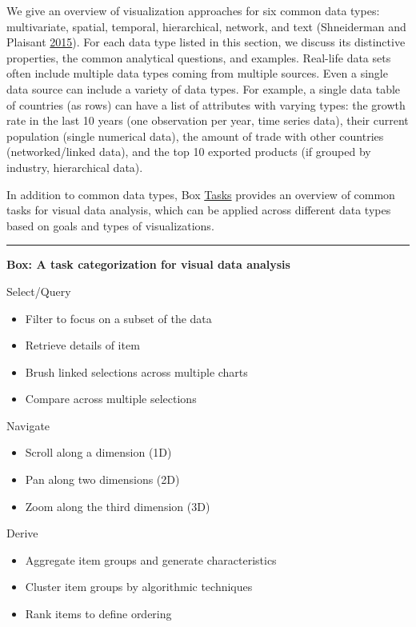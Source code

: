 \documentclass[]{krantz}
\providecommand{\tightlist}{%
  \setlength{\itemsep}{0pt}\setlength{\parskip}{0pt}}
\begin{document}
We give an overview of visualization approaches for six common data
types: multivariate, spatial, temporal, hierarchical, network, and text
(Shneiderman and Plaisant
\protect\hyperlink{ref-shneiderman2015sharpening}{2015}). For each data
type listed in this section, we discuss its distinctive properties, the
common analytical questions, and examples. Real-life data sets often
include multiple data types coming from multiple sources. Even a single
data source can include a variety of data types. For example, a single
data table of countries (as rows) can have a list of attributes with
varying types: the growth rate in the last 10 years (one observation per
year, time series data), their current population (single numerical
data), the amount of trade with other countries (networked/linked data),
and the top 10 exported products (if grouped by industry, hierarchical
data).

In addition to common data types, Box
\protect\hyperlink{box:viz2}{Tasks} provides an overview of common tasks
for visual data analysis, which can be applied across different data
types based on goals and types of visualizations.

\begin{center}\rule{0.5\linewidth}{\linethickness}\end{center}

\textbf{Box: A task categorization for visual data analysis}

Select/Query

\begin{itemize}
\tightlist
\item
  Filter to focus on a subset of the data
\item
  Retrieve details of item
\item
  Brush linked selections across multiple charts
\item
  Compare across multiple selections
\end{itemize}

Navigate

\begin{itemize}
\tightlist
\item
  Scroll along a dimension (1D)
\item
  Pan along two dimensions (2D)
\item
  Zoom along the third dimension (3D)
\end{itemize}

Derive

\begin{itemize}
\tightlist
\item
  Aggregate item groups and generate characteristics
\item
  Cluster item groups by algorithmic techniques
\item
  Rank items to define ordering
\end{itemize}
\end{document}
